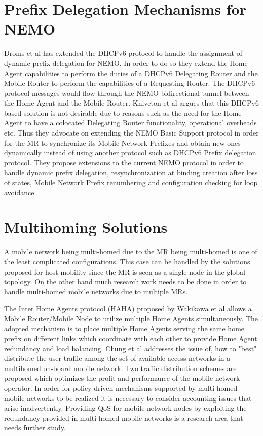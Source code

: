 \section{Prefix Delegation Mechanisms for NEMO}

Droms et al \cite{38} has extended the DHCPv6 protocol to handle the
assignment of dynamic prefix delegation for NEMO. In order to do so they
extend the Home Agent capabilities to perform the duties of a DHCPv6
Delegating Router and the Mobile Router to perform the capabilities of a
Requesting Router. The DHCPv6 protocol messages would flow through the NEMO
bidirectional tunnel between the Home Agent and the Mobile Router. Kniveton et
al \cite{39} argues that this DHCPv6 based solution is not desirable due to
reasons such as the need for the Home Agent to have a colocated Delegating
Router functionality, operational overheads etc. Thus they advocate on
extending the NEMO Basic Support protocol in order for the MR to
synchronize its Mobile Network Prefixes and obtain new ones dynamically
instead of using another protocol such as DHCPv6 Prefix delegation protocol.
They propose extensions to the current NEMO protocol in order to handle
dynamic prefix delegation, resynchronization at binding creation after loss of
states, Mobile Network Prefix renumbering and configuration checking for loop avoidance.

\section{Multihoming Solutions}

A mobile network being multi-homed due to the MR being multi-homed is one of
the least complicated configurations. This case can be handled by the
solutions proposed for host mobility since the MR is seen as a
single node in the global topology. On the other hand much research work needs
to be done in order to handle multi-homed mobile networks due to multiple MRs.

The Inter Home Agents protocol (HAHA) proposed by Wakikawa et al \cite{40}
allows a Mobile Router/Mobile Node to utilize multiple Home Agents
simultaneously. The adopted mechanism is to place multiple Home Agents serving
the same home prefix on different links which coordinate with each other to
provide Home Agent redundancy and load balancing. Chung et al \cite{41} addresses the
issue of, how to "best" distribute the user traffic among the set of available
access networks in a multihomed on-board mobile network. Two traffic
distribution schemes are proposed which optimizes the profit and performance
of the mobile network operator. In order for policy driven mechanisms
supported by multi-homed mobile networks to be realized it is necessary to
consider accounting issues that arise inadvertently. Providing QoS for mobile
network nodes by exploiting the redundancy provided in multi-homed mobile
networks is a research area that needs further study.

